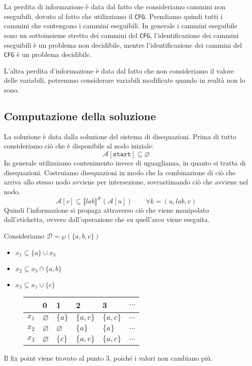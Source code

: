 La perdita di informazione è data dal fatto che consideriamo cammini non eseguibili, dovuto al fatto che 
utilizziamo il \texttt{CFG}. Prendiamo quindi tutti i cammini che contengono i cammini eseguibili.
In generale i cammini eseguibile sono un sottoinsieme stretto dei cammini del \texttt{CFG}, l'identificazione 
dei cammini eseguibili è un problema non decidibile, mentre l'identificazione dei cammini del \texttt{CFG} è un problema
decidibile.

L'altra perdita d'informazione è data dal fatto che non consideriamo il valore delle variabili, potremmo
considerare variabili modificate quando in realtà non lo sono.
\subsection{Computazione della soluzione}
La soluzione è data dalla soluzione del sistema di disequazioni.
Prima di tutto consideriamo ciò che è disponibile al nodo iniziale:
\[
\mathcal{A}[\texttt{start}] \subseteq \varnothing
\] 
In generale utilizziamo contenimento invece di uguaglianza, in quanto si tratta di disequazioni. Costruiamo
disequazioni in modo che la combinazione di ciò che arriva allo stesso nodo avviene per intersezione, sovrastimando ciò 
che avviene nel nodo. 
\[
\mathcal{A}[v] \subseteq \llbracket lab \rrbracket^\# (\mathcal{A}[u]) \qquad \forall k = (u,lab,v)
\]
Quindi l'informazione si propaga attraverso ciò che viene manipolato dall'etichetta, ovvero dall'operazione che su quell'arco viene 
eseguita.

Consideriamo $\mathcal{D} = \wp(\{a,b,c\})$
\begin{itemize}
    \item $x_1 \subseteq \{ a \} \cup x_3$
    \item $x_2 \subseteq x_3 \cap \{a, b \}$
    \item $x_3 \subseteq x_1 \cup \{ c\}$
\end{itemize}
\begin{figure}[H]
    \centering
    \renewcommand{\arraystretch}{2}
    \begin{tabular}{|>{\centering\arraybackslash}m{5em}|m{5em}|m{5em}|m{5em}|m{5em}|m{5em}|}
        \hline
        & \textbf{0} & \textbf{1} & \textbf{2} & \textbf{3} & \textbf{$\dots$} \\
        \hline
        $x_1$ & $\varnothing$ & $\{a\}$ & $\{a, c\}$ & $\{a, c\}$ & $\dots$ \\
        \hline
        $x_2$ & $\varnothing$ & $\varnothing$ & $\{a\}$ 
        & $\{a\}$ & $\dots$ \\
        \hline
        $x_3$ & $\varnothing$ &$\{c\}$ & $\{a, c\}$ & $\{a, c\}$ & $\dots$ \\
        \hline
    \end{tabular}
\end{figure}
Il fix point viene trovato al punto $3$, poiché i valori non cambiano più.

